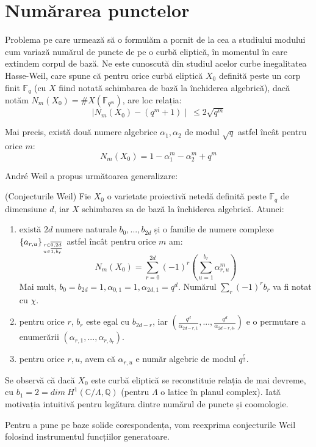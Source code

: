 \documentclass[13pt,openany,oneside]{book}
\begin{document}
\chapter{Numărarea punctelor}

Problema pe care urmează să o formulăm a pornit de la cea a studiului modului cum variază numărul de puncte de pe o curbă eliptică, în momentul în care extindem corpul de bază. Ne este cunoscută din studiul acelor curbe inegalitatea Hasse-Weil, care spune că pentru orice curbă eliptică $X_0$ definită peste un corp finit $\mathbb{F}_q$ (cu $X$ fiind notată schimbarea de bază la închiderea algebrică), dacă notăm $N_m(X_0)=\#X(\mathbb{F}_{q^m})$, are loc relația:
$$\mid N_m(X_0) - (q^m+1)\mid\  \leq 2\sqrt{q^m}$$

Mai precis, există două numere algebrice $\alpha_1,\alpha_2$ de modul $\sqrt{q}$ astfel încât pentru orice $m$:
$$N_m(X_0) = 1 - \alpha_1^m - \alpha_2^m + q^m$$

André Weil a propus următoarea generalizare:
\begin{teo}
(Conjecturile Weil) Fie $X_0$ o varietate proiectivă netedă definită peste $\mathbb{F}_q$ de dimensiune $d$, iar $X$ schimbarea sa de bază la închiderea algebrică. Atunci:
\begin{enumerate}
\item există $2d$ numere naturale $b_0,...,b_{2d}$ și o familie de numere complexe $\{a_{r,u}\}_{r\in\overline{0,2d}\atop u\in\overline{1,b_r}}$ astfel încât pentru orice $m$ am:
$$N_m(X_0)=\sum\limits_{r=0}^{2d} (-1)^r (\sum\limits_{u=1}^{b_r} \alpha_{r,u}^m)$$
Mai mult, $b_0=b_{2d}=1, \alpha_{0,1}=1, \alpha_{2d,1}=q^d$. Numărul $\sum\limits_r (-1)^r b_r$ va fi notat cu $\chi$.
\item pentru orice $r$, $b_r$ este egal cu $b_{2d-r}$, iar $(\frac{q^d}{\alpha_{2d-r,1}},...,\frac{q^d}{\alpha_{2d-r,b_r}})$ e o permutare a enumerării $(\alpha_{r,1},...,\alpha_{r,b_r})$.
\item pentru orice $r,u$, avem că $\alpha_{r,u}$ e număr algebric de modul $q^{\frac{r}{2}}$.
\end{enumerate}
\end{teo}

Se observă că dacă $X_0$ este curbă eliptică se reconstituie relația de mai devreme, cu $b_1=2=dim\ H^1(\mathbb{C}/\Lambda, \mathbb{Q})$ (pentru $\Lambda$ o latice în planul complex). Iată motivația intuitivă pentru legătura dintre numărul de puncte și coomologie.

Pentru a pune pe baze solide corespondența, vom reexprima conjecturile Weil folosind instrumentul funcțiilor generatoare.
\end{document}
